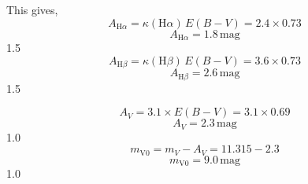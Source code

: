 \begin{description}
  This gives,
  \[ A_{\mathrm{H}\alpha} = \kappa(\mathrm{H}\alpha)\,E(B-V)
     = 2.4\times0.73 \]
  \[ \boxed{A_{\mathrm{H}\alpha} = 1.8\,\mathrm{mag}} \]
  \hfill 1.5
  \[ A_{\mathrm{H}\beta} = \kappa(\mathrm{H}\beta)\,E(B-V)
     = 3.6\times0.73 \]
  \[ \boxed{A_{\mathrm{H}\beta} = 2.6\,\mathrm{mag}} \]
  \hfill 1.5
\item[(T04.4)]
  \[ A_V = 3.1\times E(B-V) = 3.1\times0.69 \]
  \[ \boxed{A_V = 2.3\,\mathrm{mag}} \]
  \hfill 1.0
  \[ m_{\mathrm{V0}} = m_V - A_V = 11.315 - 2.3 \]
  \[ \boxed{m_{\mathrm{V0}} = 9.0\,\mathrm{mag}} \]
  \hfill 1.0
\end{description}

